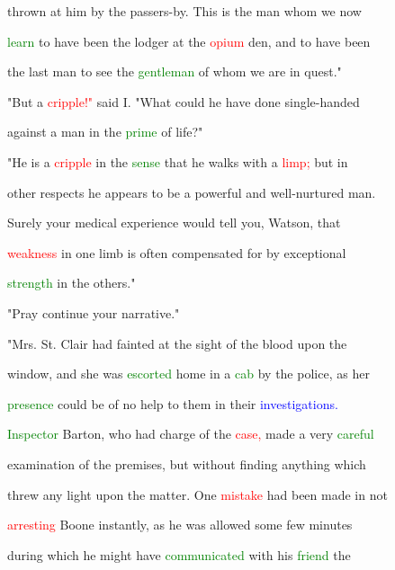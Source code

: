  thrown at him by the passers-by. This is the man whom we now

 \textcolor{green}{learn} to have been the lodger at the \textcolor{red}{opium} den, and to have been

 the last man to see the \textcolor{green}{gentleman} of whom we are in \textcolor{BurntOrange}{quest."}



 "But a \textcolor{red}{cripple!"} said I. "What could he have done single-handed

 against a man in the \textcolor{green}{prime} of life?"



 "He is a \textcolor{red}{cripple} in the \textcolor{green}{sense} that he walks with a \textcolor{red}{limp;} but in

 other \textcolor{BurntOrange}{respects} he appears to be a \textcolor{BurntOrange}{powerful} and well-nurtured man.

 Surely your \textcolor{BurntOrange}{medical} experience would tell you, Watson, that

 \textcolor{red}{weakness} in one limb is often \textcolor{BurntOrange}{compensated} for by exceptional

 \textcolor{green}{strength} in the others."



 \textcolor{BurntOrange}{"Pray} \textcolor{BurntOrange}{continue} your narrative."



 "Mrs. St. Clair had fainted at the sight of the blood upon the

 window, and she was \textcolor{green}{escorted} home in a \textcolor{green}{cab} by the \textcolor{BurntOrange}{police,} as her

 \textcolor{green}{presence} could be of no help to them in their \textcolor{blue}{investigations.}

 \textcolor{green}{Inspector} Barton, who had charge of the \textcolor{red}{case,} made a very \textcolor{green}{careful}

 \textcolor{BurntOrange}{examination} of the premises, but without finding anything which

 threw any light upon the matter. One \textcolor{red}{mistake} had been made in not

 \textcolor{red}{arresting} Boone instantly, as he was allowed some few minutes

 during which he might have \textcolor{green}{communicated} with his \textcolor{green}{friend} the

